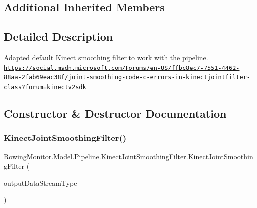 \subsection*{Additional Inherited Members}


\subsection{Detailed Description}
Adapted default Kinect smoothing filter to work with the pipeline. \href{https://social.msdn.microsoft.com/Forums/en-US/ffbc8ec7-7551-4462-88aa-2fab69eac38f/joint-smoothing-code-c-errors-in-kinectjointfilter-class?forum=kinectv2sdk}{\tt https\+://social.\+msdn.\+microsoft.\+com/\+Forums/en-\/\+U\+S/ffbc8ec7-\/7551-\/4462-\/88aa-\/2fab69eac38f/joint-\/smoothing-\/code-\/c-\/errors-\/in-\/kinectjointfilter-\/class?forum=kinectv2sdk} 



\subsection{Constructor \& Destructor Documentation}
\mbox{\label{class_rowing_monitor_1_1_model_1_1_pipeline_1_1_kinect_joint_smoothing_filter_a66e7c67626da3288c67427b6aa8f974b}} 
\subsubsection{\texorpdfstring{Kinect\+Joint\+Smoothing\+Filter()}{KinectJointSmoothingFilter()}}
{\footnotesize\ttfamily Rowing\+Monitor.\+Model.\+Pipeline.\+Kinect\+Joint\+Smoothing\+Filter.\+Kinect\+Joint\+Smoothing\+Filter (\begin{DoxyParamCaption}\item[{\hyperlink{namespace_rowing_monitor_1_1_model_1_1_util_a01e1a06061533b246feb7421c9d0107f}{Data\+Stream\+Type}}]{output\+Data\+Stream\+Type }\end{DoxyParamCaption})}



